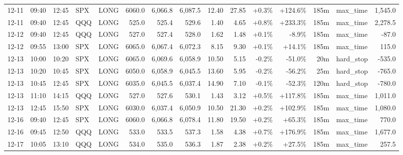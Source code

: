 \documentclass[11pt,a4paper,twoside]{article}
\begin{document}
\begin{landscape}
\begin{center}
\begin{longtable}{>{\color{txtmain}}l l l l l r r r r r r r r >{\color{txtmain}}l r}
12-11 & 09:40 & 12:45 & SPX & LONG & 6060.0 & 6,066.8 & 6,087.5 & 12.40 & 27.85 & \textcolor{wingreen}{+0.3\%} & \textcolor{wingreen}{+124.6\%} & 185m & max\_time & \textcolor{wingreen}{1,545.0} \\
12-11 & 09:40 & 12:45 & QQQ & LONG & 525.0 & 525.4 & 529.6 & 1.40 & 4.65 & \textcolor{wingreen}{+0.8\%} & \textcolor{wingreen}{+233.3\%} & 185m & max\_time & \textcolor{wingreen}{2,278.5} \\
12-12 & 09:40 & 12:45 & QQQ & LONG & 527.0 & 527.4 & 528.0 & 1.62 & 1.48 & \textcolor{wingreen}{+0.1\%} & \textcolor{lossred}{-8.9\%} & 185m & max\_time & \textcolor{lossred}{-87.0} \\
12-12 & 09:55 & 13:00 & SPX & LONG & 6065.0 & 6,067.4 & 6,072.3 & 8.15 & 9.30 & \textcolor{wingreen}{+0.1\%} & \textcolor{wingreen}{+14.1\%} & 185m & max\_time & \textcolor{wingreen}{115.0} \\
12-13 & 10:00 & 10:20 & SPX & LONG & 6065.0 & 6,069.6 & 6,058.9 & 10.50 & 5.15 & \textcolor{lossred}{-0.2\%} & \textcolor{lossred}{-51.0\%} & 20m & hard\_stop & \textcolor{lossred}{-535.0} \\
12-13 & 10:20 & 10:45 & SPX & LONG & 6050.0 & 6,058.9 & 6,045.5 & 13.60 & 5.95 & \textcolor{lossred}{-0.2\%} & \textcolor{lossred}{-56.2\%} & 25m & hard\_stop & \textcolor{lossred}{-765.0} \\
12-13 & 10:45 & 12:45 & SPX & LONG & 6035.0 & 6,045.5 & 6,037.4 & 14.90 & 7.10 & \textcolor{lossred}{-0.1\%} & \textcolor{lossred}{-52.3\%} & 120m & hard\_stop & \textcolor{lossred}{-780.0} \\
12-13 & 11:10 & 14:15 & QQQ & LONG & 527.0 & 527.6 & 530.1 & 1.43 & 3.12 & \textcolor{wingreen}{+0.5\%} & \textcolor{wingreen}{+117.8\%} & 185m & max\_time & \textcolor{wingreen}{1,011.0} \\
12-13 & 12:45 & 15:50 & SPX & LONG & 6030.0 & 6,037.4 & 6,050.9 & 10.50 & 21.30 & \textcolor{wingreen}{+0.2\%} & \textcolor{wingreen}{+102.9\%} & 185m & max\_time & \textcolor{wingreen}{1,080.0} \\
12-16 & 09:40 & 12:45 & SPX & LONG & 6060.0 & 6,066.8 & 6,078.4 & 11.80 & 19.50 & \textcolor{wingreen}{+0.2\%} & \textcolor{wingreen}{+65.3\%} & 185m & max\_time & \textcolor{wingreen}{770.0} \\
12-16 & 09:45 & 12:50 & QQQ & LONG & 533.0 & 533.5 & 537.3 & 1.58 & 4.38 & \textcolor{wingreen}{+0.7\%} & \textcolor{wingreen}{+176.9\%} & 185m & max\_time & \textcolor{wingreen}{1,677.0} \\
12-17 & 10:05 & 13:10 & QQQ & LONG & 534.0 & 535.0 & 536.3 & 1.87 & 2.38 & \textcolor{wingreen}{+0.2\%} & \textcolor{wingreen}{+27.5\%} & 185m & max\_time & \textcolor{wingreen}{257.5} \\

\end{longtable}
\end{center}
\end{landscape}
\end{document}
